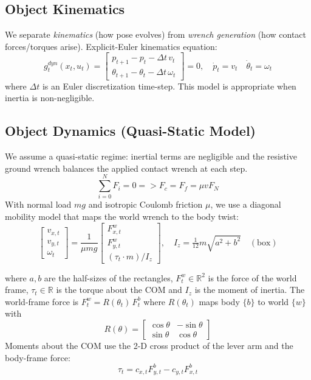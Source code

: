 \documentclass[conference]{IEEEtran}
\begin{document}
\subsection{Object Kinematics}
\noindent We separate \emph{kinematics} (how pose evolves) from \emph{wrench generation} (how contact forces/torques arise). Explicit-Euler kinematics equation:
\[
g^{dyn}_t(x_t,u_t)=
\begin{bmatrix}
     p_{t+1}- p_t-\Delta t\,v_t\\[0.15em]
    \theta_{t+1}-\theta_t-\Delta t\,\omega_t
\end{bmatrix}= 0, \quad
\dot{{p}}_t = {v}_t\quad
\dot{\theta}_t = \omega_t
\]
where $\Delta t$ is an Euler discretization time-step. This model is appropriate when inertia is non-negligible.
\medskip

\subsection{Object Dynamics (Quasi-Static Model)}
\noindent We assume a quasi-static regime: inertial terms are negligible and the resistive ground wrench balances the applied contact wrench at each step. 
\[
\sum^N_{i=0} F_{i} = 0 => F_{c} = F_{f} = \mu vF_{N}
\]
With normal load \(mg\) and isotropic Coulomb friction \(\mu\), we use a diagonal mobility model that maps the world wrench to the body twist:
\[
\begin{bmatrix} v_{x,t} \\[0.2em] v_{y,t} \\[0.2em] \omega_t\end{bmatrix}
=\frac{1}{\mu m g}
\begin{bmatrix}
F^w_{x,t} \\[0.2em] F^w_{y,t} \\[0.2em] (\tau_t \cdot m)/I_{z}
\end{bmatrix},
\quad I_{z}=\tfrac{1}{12}m\sqrt{a^2+b^2} \quad(\text{box})
\]

\noindent where \(a,b\) are the half-sizes of the rectangles, ${F}^w_t\in\mathbb{R}^2$ is the force of the world frame, $\tau_t\in\mathbb{R}$ is the torque about the COM and \(I_{z}\) is the moment of inertia. The world-frame force is \( F^w_t=R(\theta_t)\, F^b_t\) where $R(\theta_t)$ maps body $\{b\}$ to world $\{w\}$ with 
\[
R(\theta)=\begin{bmatrix}\cos\theta&-\sin\theta\\ \sin\theta&\cos\theta\end{bmatrix}
\]
Moments about the COM use the 2-D cross product of the lever arm and the body-frame force:
\[
\tau_t = c_{x,t} F^b_{y,t} - c_{y,t} F^b_{x,t}
\]
\newpage
\end{document}
